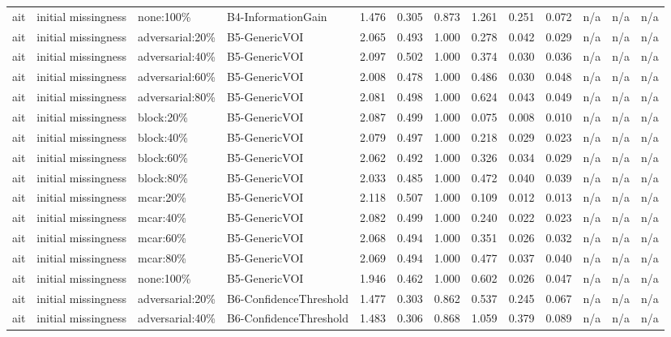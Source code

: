 \begin{table}[!ht]
{\begin{tabular}{lllllllllllll}
ait & initial missingness & none:100\% & B4-InformationGain & 1.476 & 0.305 & 0.873 & 1.261 & 0.251 & 0.072 & n/a & n/a & n/a \\
ait & initial missingness & adversarial:20\% & B5-GenericVOI & 2.065 & 0.493 & 1.000 & 0.278 & 0.042 & 0.029 & n/a & n/a & n/a \\
ait & initial missingness & adversarial:40\% & B5-GenericVOI & 2.097 & 0.502 & 1.000 & 0.374 & 0.030 & 0.036 & n/a & n/a & n/a \\
ait & initial missingness & adversarial:60\% & B5-GenericVOI & 2.008 & 0.478 & 1.000 & 0.486 & 0.030 & 0.048 & n/a & n/a & n/a \\
ait & initial missingness & adversarial:80\% & B5-GenericVOI & 2.081 & 0.498 & 1.000 & 0.624 & 0.043 & 0.049 & n/a & n/a & n/a \\
ait & initial missingness & block:20\% & B5-GenericVOI & 2.087 & 0.499 & 1.000 & 0.075 & 0.008 & 0.010 & n/a & n/a & n/a \\
ait & initial missingness & block:40\% & B5-GenericVOI & 2.079 & 0.497 & 1.000 & 0.218 & 0.029 & 0.023 & n/a & n/a & n/a \\
ait & initial missingness & block:60\% & B5-GenericVOI & 2.062 & 0.492 & 1.000 & 0.326 & 0.034 & 0.029 & n/a & n/a & n/a \\
ait & initial missingness & block:80\% & B5-GenericVOI & 2.033 & 0.485 & 1.000 & 0.472 & 0.040 & 0.039 & n/a & n/a & n/a \\
ait & initial missingness & mcar:20\% & B5-GenericVOI & 2.118 & 0.507 & 1.000 & 0.109 & 0.012 & 0.013 & n/a & n/a & n/a \\
ait & initial missingness & mcar:40\% & B5-GenericVOI & 2.082 & 0.499 & 1.000 & 0.240 & 0.022 & 0.023 & n/a & n/a & n/a \\
ait & initial missingness & mcar:60\% & B5-GenericVOI & 2.068 & 0.494 & 1.000 & 0.351 & 0.026 & 0.032 & n/a & n/a & n/a \\
ait & initial missingness & mcar:80\% & B5-GenericVOI & 2.069 & 0.494 & 1.000 & 0.477 & 0.037 & 0.040 & n/a & n/a & n/a \\
ait & initial missingness & none:100\% & B5-GenericVOI & 1.946 & 0.462 & 1.000 & 0.602 & 0.026 & 0.047 & n/a & n/a & n/a \\
ait & initial missingness & adversarial:20\% & B6-ConfidenceThreshold & 1.477 & 0.303 & 0.862 & 0.537 & 0.245 & 0.067 & n/a & n/a & n/a \\
ait & initial missingness & adversarial:40\% & B6-ConfidenceThreshold & 1.483 & 0.306 & 0.868 & 1.059 & 0.379 & 0.089 & n/a & n/a & n/a \\

\end{tabular}}
\end{table}
